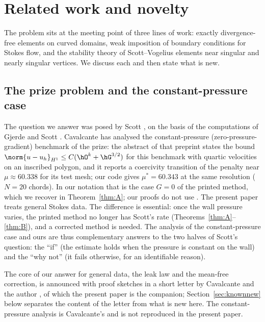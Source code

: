 \section{Related work and novelty}\label{sec:related}

The problem sits at the meeting point of three lines of work: exactly divergence-free elements on curved domains, weak imposition of boundary conditions for Stokes flow, and the stability theory of Scott--Vogelius elements near singular and nearly singular vertices. We discuss each and then state what is new.

\subsection{The prize problem and the constant-pressure case}
The question we answer was posed by Scott \cite{ScottPrize}, on the basis of the computations of Gjerde and Scott \cite{GjerdeScott2024}. Cavalcante \cite{Cavalcante} has analysed the constant-pressure (zero-pressure-gradient) benchmark of the prize: the abstract of that preprint states the bound $\norm{u-u_h}_{H^1}\le C(\hO^k+\hG^{3/2})$ for this benchmark with quartic velocities on an inscribed polygon, and it reports a coercivity transition of the penalty near $\mu\approx60.338$ for its test mesh; our code gives $\mu^\ast=60.343$ at the same resolution ($N=20$ chords). In our notation that is the case $G=0$ of the printed method, which we recover in Theorem~\ref{thm:A}; our proofs do not use \cite{Cavalcante}. The present paper treats general Stokes data. The difference is essential: once the wall pressure varies, the printed method no longer has Scott's rate (Theorems~\ref{thm:A}--\ref{thm:B}), and a corrected method is needed. The analysis of the constant-pressure case and ours are thus complementary answers to the two halves of Scott's question: the ``if'' (the estimate holds when the pressure is constant on the wall) and the ``why not'' (it fails otherwise, for an identifiable reason).

The core of our answer for general data, the leak law and the mean-free correction, is announced with proof sketches in a short letter by Cavalcante and the author \cite{CavalcantePadhiLetter}, of which the present paper is the companion; Section~\ref{sec:knownnew} below separates the content of the letter from what is new here. The constant-pressure analysis is Cavalcante's \cite{Cavalcante} and is not reproduced in the present paper.

